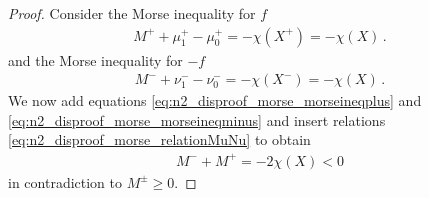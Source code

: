 \begin{proof}
  Consider the Morse inequality for $f$
  \begin{align}
    M^++\mu^+_1-\mu^+_0=-\chi(X^+)=-\chi(X)\,.\label{eq:n2_disproof_morse_morseineqplus}
  \end{align}
  and the Morse inequality for $-f$
  \begin{align}
    M^-+\nu^-_1-\nu^-_0=-\chi(X^-)=-\chi(X)\,.\label{eq:n2_disproof_morse_morseineqminus}
  \end{align}
  We now add equations \eqref{eq:n2_disproof_morse_morseineqplus} and \eqref{eq:n2_disproof_morse_morseineqminus}
  and insert relations \eqref{eq:n2_disproof_morse_relationMuNu} to obtain
  \begin{align*}
    M^-+M^+=-2\chi(X)<0
  \end{align*}
  in contradiction to $M^\pm\geq0$.
\end{proof}


